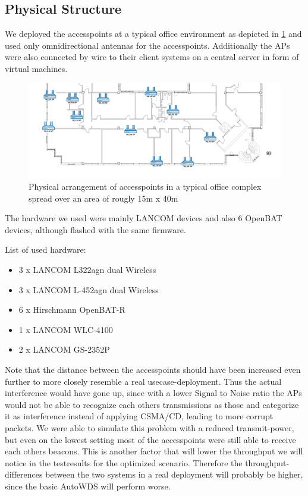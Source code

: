 \newpage
   
    \subsection{Physical Structure}
      We deployed the accesspoints at a typical office environment as depicted in \ref{fig:2ndfloor} and used only omnidirectional antennas for the accesspoints.
      Additionally the APs were also connected by wire to their client systems on a central server in form of virtual machines.
      
      \begin{figure}[h!]
	\centering
	\includegraphics[width=\columnwidth]{figures/Lancom-flur-withaps}
	\caption{Physical arrangement of accesspoints in a typical office complex spread over an area of rougly 15m x 40m}
	\label{fig:2ndfloor}
      \end{figure}
      
      The hardware we used were mainly LANCOM devices and also 6 OpenBAT devices, although flashed with the same firmware.
     
      List of used hardware:
      \begin{itemize}
	\item 3 x LANCOM L322agn dual Wireless \cite{lancom}
	\item 3 x LANCOM L-452agn dual Wireless
	\item 6 x Hirschmann OpenBAT-R
	\item 1 x LANCOM WLC-4100
	\item 2 x LANCOM GS-2352P
      \end{itemize}
      
      Note that the distance between the accesspoints should have been increased even further to more closely resemble a real usecase-deployment.
      Thus the actual interference would have gone up, since with a lower Signal to Noise ratio the APs would not be able to recognize each others 
      transmissions as those and categorize it as interference instead of applying CSMA/CD, leading to more corrupt packets.
      We were able to simulate this problem with a reduced transmit-power,
      but even on the lowest setting most of the accesspoints were still able to receive each others beacons. 
      This is another factor that will lower the throughput we will notice in the testresults for the optimized scenario.
      Therefore the throughput-differences between the two systems in a real deployment will probably be higher, since the basic AutoWDS will perform worse.
    
